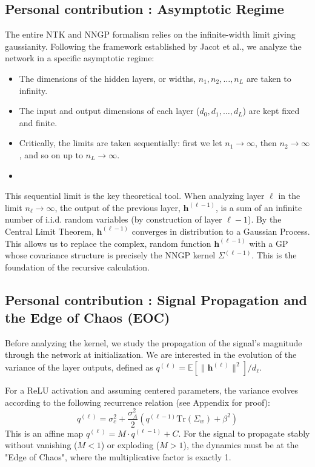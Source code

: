 \documentclass[a4paper]{article}
\theoremstyle{plain}
\theoremstyle{definition}
\theoremstyle{remark}
\begin{document}
\subsection{Personal contribution : Asymptotic Regime}
The entire NTK and NNGP formalism relies on the infinite-width limit giving gaussianity. Following the framework established by Jacot et al., we analyze the network in a specific asymptotic regime:
\begin{itemize}
    \item The dimensions of the hidden layers, or widths, $n_1, n_2, \dots, n_L$ are taken to infinity.
    \item The input and output dimensions of each layer ($d_0, d_1, \dots, d_L$) are kept fixed and finite.
    \item Critically, the limits are taken sequentially: first we let $n_1 \to \infty$, then $n_2 \to \infty$, and so on up to $n_L \to \infty$.
    \item 
\end{itemize}
\begin{tcolorbox}[colback=green!5,colframe=green!80!black,title={\textbf{Remark: Sequential Limit as Key Theoretical Tool}},enhanced,drop shadow,boxrule=2pt]
This sequential limit is the key theoretical tool. When analyzing layer $\ell$ in the limit $n_\ell \to \infty$, the output of the previous layer, $\bm{h}^{(\ell-1)}$, is a sum of an infinite number of i.i.d. random variables (by construction of layer $\ell-1$). By the Central Limit Theorem, $\bm{h}^{(\ell-1)}$ converges in distribution to a Gaussian Process. This allows us to replace the complex, random function $\bm{h}^{(\ell-1)}$ with a GP whose covariance structure is precisely the NNGP kernel $\Sigma^{(\ell-1)}$. This is the foundation of the recursive calculation.
\end{tcolorbox}

\subsection{Personal contribution : Signal Propagation and the Edge of Chaos (EOC)}
Before analyzing the kernel, we study the propagation of the signal's magnitude through the network at initialization. We are interested in the evolution of the variance of the layer outputs, defined as $q^{(\ell)} = \mathbb{E}[\|\bm{h}^{(\ell)}\|^2]/d_\ell$.

For a ReLU activation and assuming centered parameters, the variance evolves according to the following recurrence relation (see Appendix for proof):
\begin{equation}
    q^{(\ell)} = \sigma_c^2 + \frac{\sigma_A^2}{2} \left( q^{(\ell-1)}\text{Tr}(\Sigma_w) + \beta^2 \right)
\end{equation}
This is an affine map $q^{(\ell)} = M \cdot q^{(\ell-1)} + C$. For the signal to propagate stably without vanishing ($M<1$) or exploding ($M>1$), the dynamics must be at the "Edge of Chaos", where the multiplicative factor is exactly 1.
\end{document}
